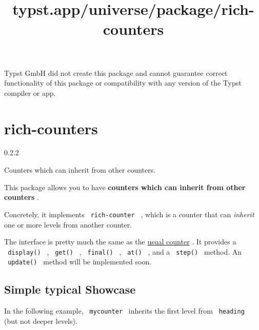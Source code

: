 Typst GmbH did not create this package and cannot guarantee correct
functionality of this package or compatibility with any version of the
Typst compiler or app.


\title{typst.app/universe/package/rich-counters}

\label{banner}
\section{rich-counters}\label{rich-counters}

{ 0.2.2 }

Counters which can inherit from other counters.

\label{readme}
This package allows you to have \textbf{counters which can inherit from
other counters} .

Concretely, it implements \texttt{\ rich-counter\ } , which is a counter
that can \emph{inherit} one or more levels from another counter.

The interface is pretty much the same as the
\href{https://typst.app/docs/reference/introspection/counter/}{usual
counter} . It provides a \texttt{\ display()\ } , \texttt{\ get()\ } ,
\texttt{\ final()\ } , \texttt{\ at()\ } , and a \texttt{\ step()\ }
method. An \texttt{\ update()\ } method will be implemented soon.

\subsection{Simple typical Showcase}\label{simple-typical-showcase}

In the following example, \texttt{\ mycounter\ } inherits the first
level from \texttt{\ heading\ } (but not deeper levels).

